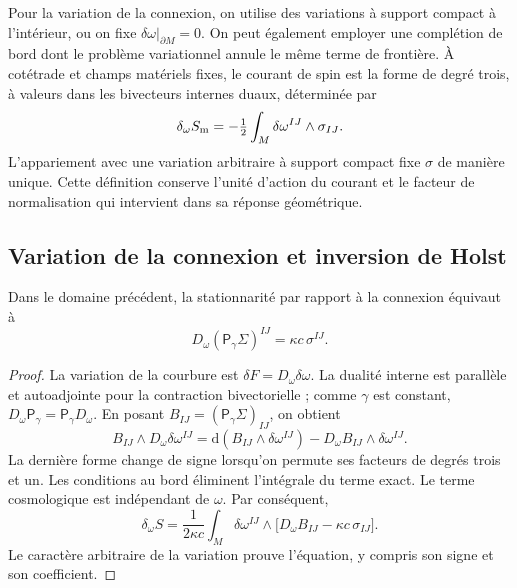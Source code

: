 Pour la variation de la connexion, on utilise des variations à support compact à l'intérieur, ou on fixe \(\delta\omega|_{\partial M}=0\). On peut également employer une complétion de bord dont le problème variationnel annule le même terme de frontière. À cotétrade et champs matériels fixes, le courant de spin est la forme de degré trois, à valeurs dans les bivecteurs internes duaux, déterminée par
\begin{equation}
 \delta_\omega S_{\rm m}
 =-\tfrac12\int_M\delta\omega^{IJ}\wedge\sigma_{IJ}.
 \label{vii:vii:eq:corriente-variacional}
\end{equation}
L'appariement avec une variation arbitraire à support compact fixe
\(\sigma\) de manière unique. Cette définition conserve l'unité
d'action du courant et le facteur de normalisation qui intervient dans
sa réponse géométrique.

\subsection{Variation de la connexion et inversion de Holst}
\label{vii:vii:subsec:variacion-holst}

\begin{theorem}
\label{vii:vii:thm:ecuacion-cartan-holst}
Dans le domaine précédent, la stationnarité par rapport à la connexion
équivaut à
\begin{equation}
 D_\omega(\mathsf P_\gamma\Sigma)^{IJ}
       =\kappa c\,\sigma^{IJ}.
 \label{vii:vii:eq:ecuacion-cartan-holst}
\end{equation}
\end{theorem}
\begin{proof}
La variation de la courbure est
\(\delta F=D_\omega\delta\omega\). La dualité interne est parallèle
et autoadjointe pour la contraction bivectorielle ; comme \(\gamma\) est
constant, \(D_\omega\mathsf P_\gamma=\mathsf P_\gamma D_\omega\).
En posant \(B_{IJ}=(\mathsf P_\gamma\Sigma)_{IJ}\), on obtient
\[
 B_{IJ}\wedge D_\omega\delta\omega^{IJ}
 =\mathrm d(B_{IJ}\wedge\delta\omega^{IJ})
   -D_\omega B_{IJ}\wedge\delta\omega^{IJ}.
\]
La dernière forme change de signe lorsqu'on permute ses facteurs de degrés trois
et un. Les conditions au bord éliminent l'intégrale du terme
exact. Le terme cosmologique est indépendant de \(\omega\).
Par conséquent,
\[
 \delta_\omega S=
 \frac1{2\kappa c}\int_M\delta\omega^{IJ}\wedge
       \bigl[D_\omega B_{IJ}-\kappa c\,\sigma_{IJ}\bigr].
\]
Le caractère arbitraire de la variation prouve l'équation, y compris son signe et son coefficient.
\end{proof}


